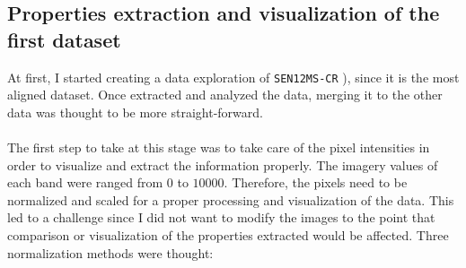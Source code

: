 \documentclass[11pt, a4paper]{article}
\begin{document}
	\subsection{Properties extraction and visualization of the first dataset}
	At first, I started creating a data exploration of \texttt{SEN12MS-CR} \cite{sen12mscr}), since it is the most aligned dataset. Once extracted and analyzed the data, merging it to the other data was thought to be more straight-forward.
	\\\\
	The first step to take at this stage was to take care of the pixel intensities in order to visualize and extract the information properly. The imagery values of each band were ranged from $0$ to $10000$. Therefore, the pixels need to be normalized and scaled for a proper processing and visualization of the data. This led to a challenge since I did not want to modify the images to the point that comparison or visualization of the properties extracted would be affected. Three normalization methods were thought:
\end{document}
